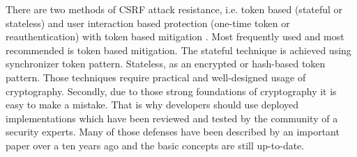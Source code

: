 \documentclass{article} %
\begin{document}
There are two methods of CSRF attack resistance, i.e. token based (stateful or stateless) and user interaction based protection (one-time token or reauthentication) with token based mitigation \cite{bib:owasp_prevention}. Most frequently used and most recommended is token based mitigation. The stateful technique is achieved using synchronizer token pattern. Stateless, as an encrypted or hash-based token pattern. Those techniques require practical and well-designed usage of cryptography. Secondly, due to those strong foundations of cryptography it is easy to make a mistake. That is why developers should use deployed implementations which have been reviewed and tested by the community of a security experts. Many of those defenses have been described by an important paper over a ten years ago \cite{bib:robust_defenses} and the basic concepts are still up-to-date.\\
\newline
\end{document}

